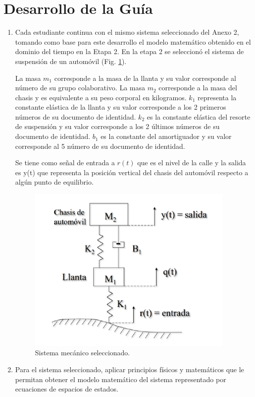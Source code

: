 \documentclass{article}
\begin{document}
\section{Desarrollo de la Guía}
\begin{enumerate}
  \item Cada estudiante continua con el mismo sistema seleccionado del Anexo 2, tomando como base para este desarrollo el modelo matemático obtenido en el dominio del tiempo en la Etapa 2.
  En la etapa 2 se seleccionó el sistema de suspensión de un automóvil (Fig. \ref{fig:sistema_mecanico}).

  La masa $m_1$ corresponde a la masa de la llanta y su valor corresponde al número de su grupo colaborativo. La masa $m_2$ corresponde a la masa del chasis y es equivalente a su peso corporal en kilogramos. $k_1$ representa la constante elástica de la llanta y su valor corresponde a los 2 primeros números de su documento de identidad. $k_2$ es la constante elástica del resorte de suspensión y su valor corresponde a los 2 últimos números de su documento de identidad. $b_1$ es la constante del amortiguador y su valor corresponde al 5 número de su documento de identidad.

  Se tiene como señal de entrada a $r(t)$ que es el nivel de la calle y la salida es y(t) que representa la posición vertical del chasis del automóvil respecto a algún punto de equilibrio.

  \begin{figure}
    \centering
    \includegraphics[width=10cm]{img/sistema.png}
    \caption{Sistema mecánico seleccionado.}
    \label{fig:sistema_mecanico}
  \end{figure}

  \item Para el sistema seleccionado, aplicar principios físicos y matemáticos que le permitan obtener el modelo matemático del sistema representado por ecuaciones de espacios de estados.


\end{enumerate}
\end{document}
